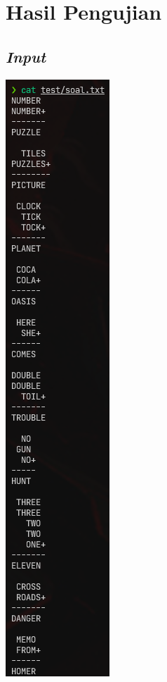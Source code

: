 \documentclass{article}
\let\origfigure\figure
\let\endorigfigure\endfigure
\renewenvironment{figure}[1][2] {
    \expandafter\origfigure\expandafter[H]
} {
    \endorigfigure
}
\begin{document}
\section{Hasil Pengujian}

\subsection{\textit{Input}}
\begin{figure}
  \includegraphics{stima-ss-3.png}
  \caption{Masukan program (10 soal)}
\end{figure}
\end{document}
